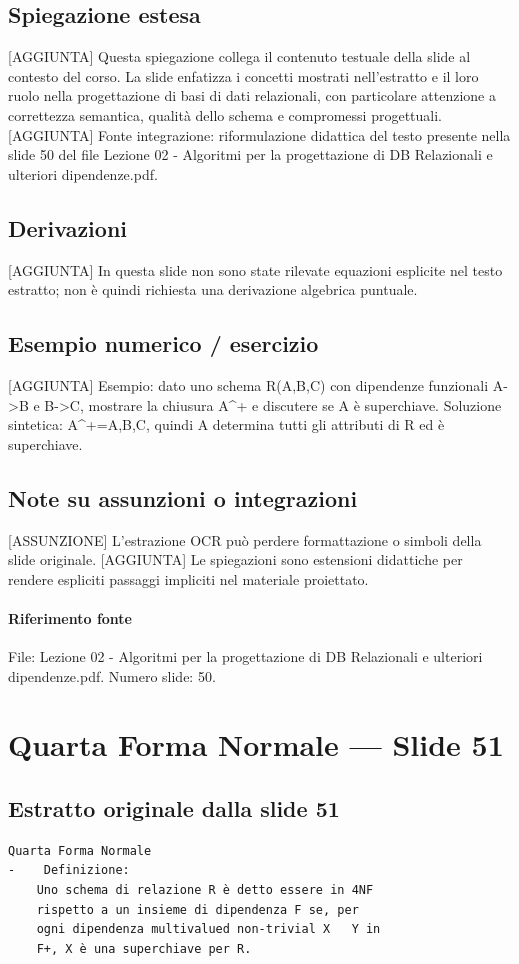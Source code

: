 \documentclass[11pt]{article}
\begin{document}
\subsection*{Spiegazione estesa}
[AGGIUNTA] Questa spiegazione collega il contenuto testuale della slide al contesto del corso. La slide enfatizza i concetti mostrati nell'estratto e il loro ruolo nella progettazione di basi di dati relazionali, con particolare attenzione a correttezza semantica, qualità dello schema e compromessi progettuali.
[AGGIUNTA] Fonte integrazione: riformulazione didattica del testo presente nella slide 50 del file Lezione 02 - Algoritmi per la progettazione di DB Relazionali e ulteriori dipendenze.pdf.
\subsection*{Derivazioni}
[AGGIUNTA] In questa slide non sono state rilevate equazioni esplicite nel testo estratto; non è quindi richiesta una derivazione algebrica puntuale.
\subsection*{Esempio numerico / esercizio}
[AGGIUNTA] Esempio: dato uno schema R(A,B,C) con dipendenze funzionali A->B e B->C, mostrare la chiusura A^+ e discutere se A è superchiave. Soluzione sintetica: A^+={A,B,C}, quindi A determina tutti gli attributi di R ed è superchiave.
\subsection*{Note su assunzioni o integrazioni}
[ASSUNZIONE] L'estrazione OCR può perdere formattazione o simboli della slide originale.
[AGGIUNTA] Le spiegazioni sono estensioni didattiche per rendere espliciti passaggi impliciti nel materiale proiettato.
\paragraph{Riferimento fonte} File: Lezione 02 - Algoritmi per la progettazione di DB Relazionali e ulteriori dipendenze.pdf. Numero slide: 50.
\section{Quarta Forma Normale --- Slide 51}
\subsection*{Estratto originale dalla slide 51}
\begin{lstlisting}
Quarta Forma Normale
-    Definizione:
    Uno schema di relazione R è detto essere in 4NF
    rispetto a un insieme di dipendenza F se, per
    ogni dipendenza multivalued non-trivial X   Y in
    F+, X è una superchiave per R.
\end{lstlisting}
\end{document}
